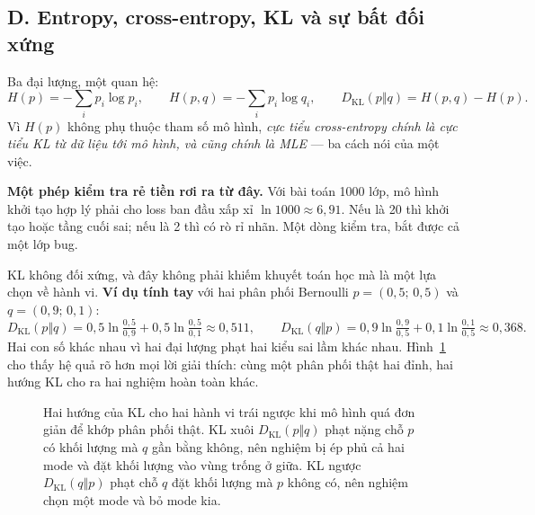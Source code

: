 \documentclass[../../../deep_learning.tex]{subfiles}
\begin{document}
\subsection{D. Entropy, cross-entropy, KL và sự bất đối xứng}
Ba đại lượng, một quan hệ:
\[
H(p) = -\sum_i p_i\log p_i,\qquad
H(p,q) = -\sum_i p_i \log q_i,\qquad
D_{\mathrm{KL}}(p\Vert q) = H(p,q)-H(p).
\]
Vì \(H(p)\) không phụ thuộc tham số mô hình, \emph{cực tiểu cross-entropy chính là cực tiểu KL từ dữ liệu tới mô hình, và cũng chính là MLE} --- ba cách nói của một việc.

\textbf{Một phép kiểm tra rẻ tiền rơi ra từ đây.} Với bài toán 1000 lớp, mô hình khởi tạo hợp lý phải cho loss ban đầu xấp xỉ \(\ln 1000 \approx 6{,}91\). Nếu là 20 thì khởi tạo hoặc tầng cuối sai; nếu là 2 thì có rò rỉ nhãn. Một dòng kiểm tra, bắt được cả một lớp bug.

KL không đối xứng, và đây không phải khiếm khuyết toán học mà là một lựa chọn về hành vi. \textbf{Ví dụ tính tay} với hai phân phối Bernoulli \(p=(0{,}5;\,0{,}5)\) và \(q=(0{,}9;\,0{,}1)\):
\[
D_{\mathrm{KL}}(p\Vert q) = 0{,}5\ln\tfrac{0{,}5}{0{,}9} + 0{,}5\ln\tfrac{0{,}5}{0{,}1} \approx 0{,}511,\qquad
D_{\mathrm{KL}}(q\Vert p) = 0{,}9\ln\tfrac{0{,}9}{0{,}5} + 0{,}1\ln\tfrac{0{,}1}{0{,}5} \approx 0{,}368 .
\]
Hai con số khác nhau vì hai đại lượng phạt hai kiểu sai lầm khác nhau. Hình~\ref{fig:kl-huong} cho thấy hệ quả rõ hơn mọi lời giải thích: cùng một phân phối thật hai đỉnh, hai hướng KL cho ra hai nghiệm hoàn toàn khác.

\begin{figure}[H]\centering
{}
\caption{Hai hướng của KL cho hai hành vi trái ngược khi mô hình quá đơn giản để khớp phân phối thật. KL xuôi \(D_{\mathrm{KL}}(p\Vert q)\) phạt nặng chỗ \(p\) có khối lượng mà \(q\) gần bằng không, nên nghiệm bị ép phủ cả hai mode và đặt khối lượng vào vùng trống ở giữa. KL ngược \(D_{\mathrm{KL}}(q\Vert p)\) phạt chỗ \(q\) đặt khối lượng mà \(p\) không có, nên nghiệm chọn một mode và bỏ mode kia.}
\label{fig:kl-huong}
\end{figure}
\end{document}
